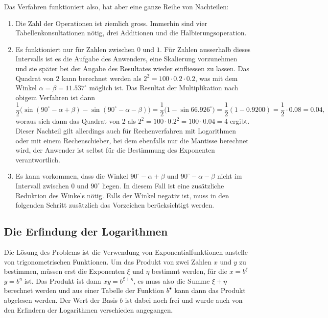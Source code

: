 Das Verfahren funktioniert also, hat aber eine ganze Reihe von Nachteilen:
\begin{enumerate}
\item
Die Zahl der Operationen ist ziemlich gross.
Immerhin sind vier Tabellenkonsultationen nötig, drei Additionen und die
Halbierungsoperation.
\item
Es funktioniert nur für Zahlen zwischen $0$ und $1$.
Für Zahlen ausserhalb dieses Intervalls ist es die Aufgabe des
Anwenders, eine Skalierung vorzunehmen und sie später bei der Angabe
des Resultates wieder einfliessen zu lassen.
Das Quadrat von $2$ kann berechnet werden als
\(2^2 = 100 \cdot 0.2\cdot 0.2\), was mit dem Winkel
$\alpha=\beta=11.537^\circ$ möglich ist. 
Das Resultat der Multiplikation nach obigem Verfahren ist dann 
\[
\frac12\bigl(
\sin(90^\circ-\alpha+\beta)
-
\sin(90^\circ-\alpha-\beta)
\bigr)
=
\frac12\bigl(
1-
\sin 66.926^\circ
\bigr)
=
\frac12( 1-0.9200)
=
\frac12\cdot 0.08=0.04,
\]
woraus sich dann das Quadrat von $2$ als
$2^2 = 100\cdot 0.2^2 = 100\cdot 0.04 = 4$
ergibt.
Dieser Nachteil gilt allerdings auch für Rechenverfahren mit Logarithmen
oder mit einem Rechenschieber, bei dem ebenfalls nur die Mantisse
berechnet wird, der Anwender ist selbst für die Bestimmung des Exponenten
verantwortlich.
\item
Es kann vorkommen, dass die Winkel $90^\circ-\alpha+\beta$
und $90^\circ-\alpha-\beta$ nicht im Intervall zwischen $0$ und $90^\circ$
liegen.
In diesem Fall ist eine zusätzliche Reduktion des Winkels nötig.
Falls der Winkel negativ ist, muss in den folgenden Schritt zusätzlich
das Vorzeichen berücksichtigt werden.
\end{enumerate}


\subsection{Die Erfindung der Logarithmen}
Die Lösung des Problems ist die Verwendung von Exponentialfunktionen 
anstelle von trigonometrischen Funktionen.
Um das Produkt von zwei Zahlen $x$ und $y$ zu bestimmen, müssen erst
die Exponenten $\xi$ und $\eta$ bestimmt werden, für die $x=b^\xi$
$y=b^\eta$ ist.
Das Produkt ist dann $xy = b^{\xi+\eta}$, es muss also die Summe
$\xi+\eta$ berechnet werden und aus einer Tabelle der Funktion
$b^\bullet$ kann dann das Produkt abgelesen werden.
Der Wert der Basis $b$ ist dabei noch frei und wurde auch von
den Erfindern der Logarithmen verschieden angegangen.

